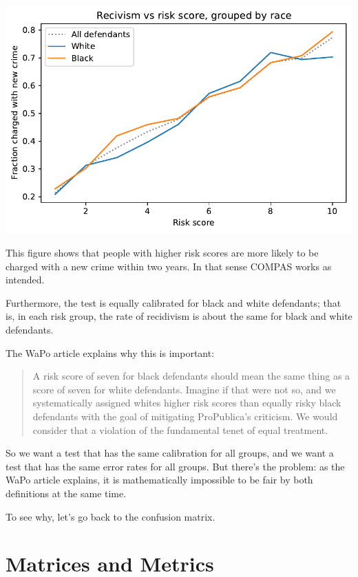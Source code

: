 \begin{center}
\includegraphics[scale=0.75]{chapters/02_calibration_files/02_calibration_21_0.pdf}
\end{center}

This figure shows that people with higher risk scores are more likely to
be charged with a new crime within two years. In that sense COMPAS works
as intended.

Furthermore, the test is equally calibrated for black and white
defendants; that is, in each risk group, the rate of recidivism is about
the same for black and white defendants.

The WaPo article explains why this is important:

\begin{quote}
A risk score of seven for black defendants should mean the same thing as
a score of seven for white defendants. Imagine if that were not so, and
we systematically assigned whites higher risk scores than equally risky
black defendants with the goal of mitigating ProPublica's criticism. We
would consider that a violation of the fundamental tenet of equal
treatment.
\end{quote}

So we want a test that has the same calibration for all groups, and we
want a test that has the same error rates for all groups. But there's
the problem: as the WaPo article explains, it is mathematically
impossible to be fair by both definitions at the same time.

To see why, let's go back to the confusion matrix.

\hypertarget{matrices-and-metrics}{%
\section{Matrices and Metrics}\label{matrices-and-metrics}}

